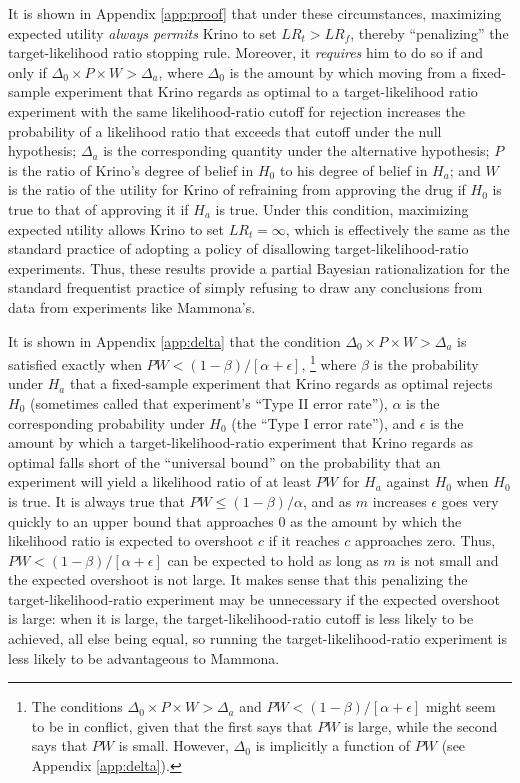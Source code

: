\documentclass{article}
\theoremstyle{definition}
\begin{document}
It is shown in Appendix \ref{app:proof} that under these circumstances, maximizing expected utility \textit{always permits} Krino to set $LR_t>LR_f$, thereby ``penalizing'' the target-likelihood ratio stopping rule.
Moreover, it \textit{requires} him to do so if and only if $\Delta_0\times P\times W>\Delta_a$, where $\Delta_0$ is the amount by which moving from a fixed-sample experiment that Krino regards as optimal to a target-likelihood ratio experiment with the same likelihood-ratio cutoff for rejection increases the probability of a likelihood ratio that exceeds that cutoff under the null hypothesis; $\Delta_a$ is the corresponding quantity under the alternative hypothesis; $P$ is the ratio of Krino's degree of belief in $H_0$ to his degree of belief in $H_a$; and $W$ is the ratio of the utility for Krino of refraining from approving the drug if $H_0$ is true to that of approving it if $H_a$ is true.
Under this condition, maximizing expected utility allows Krino to set $LR_t=\infty$, which is effectively the same as the standard practice of adopting a policy of disallowing target-likelihood-ratio experiments.
Thus, these results provide a partial Bayesian rationalization for the standard frequentist practice of simply refusing to draw any conclusions from data from experiments like Mammona's.

It is shown in Appendix \ref{app:delta} that the condition $\Delta_0\times P\times W>\Delta_a$ is satisfied exactly when $PW<(1-\beta)/[\alpha+\epsilon]$,%
\footnote{%
The conditions $\Delta_0\times P\times W>\Delta_a$ and $PW<(1-\beta)/[\alpha+\epsilon]$ might seem to be in conflict, given that the first says that $PW$ is large, while the second says that $PW$ is small.
However, $\Delta_0$ is implicitly a function of $PW$ (see Appendix \ref{app:delta}).
}
 where $\beta$ is the probability under $H_a$ that a fixed-sample experiment that Krino regards as optimal rejects $H_0$ (sometimes called that experiment's ``Type II error rate''), $\alpha$ is the corresponding probability under $H_0$ (the ``Type I error rate''), and $\epsilon$ is the amount by which a target-likelihood-ratio experiment that Krino regards as optimal falls short of the ``universal bound'' on the probability that an experiment will yield a likelihood ratio of at least $P W$ for $H_a$ against $H_0$ when $H_0$ is true.
It is always true that $PW\leq (1-\beta)/\alpha$, and as $m$ increases $\epsilon$ goes very quickly to an upper bound that approaches 0 as the amount by which the likelihood ratio is expected to overshoot $c$ if it reaches $c$ approaches zero.
Thus, $PW<(1-\beta)/[\alpha+\epsilon]$ can be expected to hold as long as $m$ is not small and the expected overshoot is not large.
It makes sense that this penalizing the target-likelihood-ratio experiment may be unnecessary if the expected overshoot is large: when it is large, the target-likelihood-ratio cutoff is less likely to be achieved, all else being equal, so running the target-likelihood-ratio experiment is less likely to be advantageous to Mammona.
\end{document}
